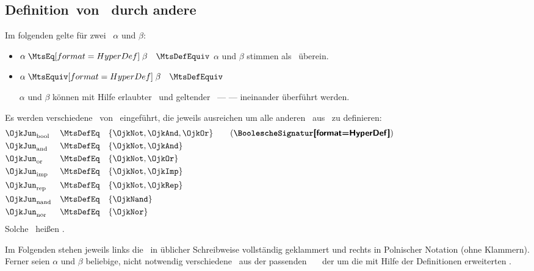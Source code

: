 \subsection[Definition von Junktoren durch andere]{Definition\ von \Junktoren\ durch andere}
\label                    {sub:JunktorDef}

Im folgenden gelte für zwei \aussagenlogischeFormeln\ $\alpha$ und $\beta$:
\begin{itemize}
	\item[] $\alpha \defSymBin{\MtsEq}    \beta \quad \MtsDefEquiv$ \quad $\alpha$ und $\beta$
	stimmen als \Zeichenkette\ überein.
	\item[] $\alpha \defSymBin{\MtsEquiv} \beta \quad \MtsDefEquiv$ \quad
	\parbox[t]{13cm}{$\alpha$ und $\beta$ können mit Hilfe erlaubter \Ersetzungen\ und geltender \Axiome\ ---  --- ineinander überführt werden.}
\end{itemize}

Es werden verschiedene \Teilmengen\ von \OjkJun\ eingeführt, die jeweils ausreichen um alle anderen \Elemente\ aus \OjkJun\ zu definieren:
\begin{align}
&\OjkJun_{\RawMtsIdxBool}&\MtsDefEq\quad&\{\OjkNot,\OjkAnd,\OjkOr\}\label{def:Jbool}
\qquad \text{(\defTxt{\BoolescheSignatur})}
\\
&\OjkJun_{\RawMtsIdxAnd} &\MtsDefEq\quad&\{\OjkNot,\OjkAnd \}\label{def:Jand}
\\
&\OjkJun_{\RawMtsIdxOr}  &\MtsDefEq\quad&\{\OjkNot,\OjkOr  \}\label{def:Jor}
\\
&\OjkJun_{\RawMtsIdxImp} &\MtsDefEq\quad&\{\OjkNot,\OjkImp \}\label{def:Jimp}
\\
&\OjkJun_{\RawMtsIdxRep} &\MtsDefEq\quad&\{\OjkNot,\OjkRep \}\label{def:Jrep}
\\
&\OjkJun_{\RawMtsIdxNand}&\MtsDefEq\quad&\{\OjkNand        \}\label{def:Jnand}
\\
&\OjkJun_{\RawMtsIdxNor} &\MtsDefEq\quad&\{\OjkNor         \}\label{def:Jnor}
\formulatoleft\formulatoleft\formulatoleft
\end{align}
Solche \Teilmengen\ heißen \logischeSignatur.

Im Folgenden stehen jeweils links die \Formeln\ in üblicher Schreibweise vollständig geklammert und rechts in Polnischer Notation (ohne Klammern).
Ferner seien $\alpha$ und $\beta$ beliebige, nicht notwendig verschiedene \Formeln\ aus der passenden \Menge\ \OjkForx\ \textbzgl\ der um die mit Hilfe der Definitionen erweiterten \Formelmenge.

